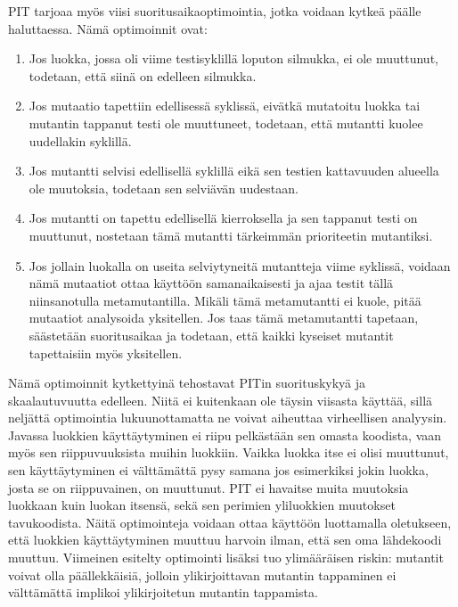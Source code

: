 \documentclass[finnish]{tktltiki2}
\begin{document}
PIT tarjoaa myös viisi suoritusaikaoptimointia, jotka voidaan kytkeä päälle haluttaessa. Nämä optimoinnit ovat:
\begin{enumerate}
	\item Jos luokka, jossa oli viime testisyklillä loputon silmukka, ei ole muuttunut, todetaan, että siinä on edelleen silmukka.
	\item Jos mutaatio tapettiin edellisessä syklissä, eivätkä mutatoitu luokka tai mutantin tappanut testi ole muuttuneet, todetaan, että mutantti kuolee uudellakin syklillä.
	\item Jos mutantti selvisi edellisellä syklillä eikä sen testien kattavuuden alueella ole muutoksia, todetaan sen selviävän uudestaan. 
	\item Jos mutantti on tapettu edellisellä kierroksella ja sen tappanut testi on muuttunut, nostetaan tämä mutantti tärkeimmän prioriteetin mutantiksi.
	\item Jos jollain luokalla on useita selviytyneitä mutantteja viime syklissä, voidaan nämä mutaatiot ottaa käyttöön samanaikaisesti ja ajaa testit tällä niinsanotulla metamutantilla. Mikäli tämä metamutantti ei kuole, pitää mutaatiot analysoida yksitellen. Jos taas tämä metamutantti tapetaan, säästetään suoritusaikaa ja todetaan, että kaikki kyseiset mutantit tapettaisiin myös yksitellen.
\end{enumerate}
Nämä optimoinnit kytkettyinä tehostavat PITin suorituskykyä ja skaalautuvuutta edelleen. Niitä ei kuitenkaan ole täysin viisasta käyttää, sillä neljättä optimointia lukuunottamatta ne voivat aiheuttaa virheellisen analyysin. Javassa luokkien käyttäytyminen ei riipu pelkästään sen omasta koodista, vaan myös sen riippuvuuksista muihin luokkiin. Vaikka luokka itse ei olisi muuttunut, sen käyttäytyminen ei välttämättä pysy samana jos esimerkiksi jokin luokka, josta se on riippuvainen, on muuttunut. PIT ei havaitse muita muutoksia luokkaan kuin luokan itsensä, sekä sen perimien yliluokkien muutokset tavukoodista. Näitä optimointeja voidaan ottaa käyttöön luottamalla oletukseen, että luokkien käyttäytyminen muuttuu harvoin ilman, että sen oma lähdekoodi muuttuu. Viimeinen esitelty optimointi lisäksi tuo ylimääräisen riskin: mutantit voivat olla päällekkäisiä, jolloin ylikirjoittavan mutantin tappaminen ei välttämättä implikoi ylikirjoitetun mutantin tappamista.
\end{document}
